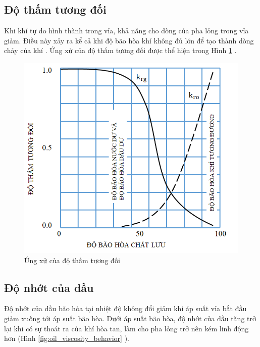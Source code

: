 \documentclass[12pt,a4paper]{report}
\begin{document}
\subsection{Độ thấm tương đối}
Khi khí tự do hình thành trong vỉa, khả năng cho dòng của pha lỏng trong vỉa giảm. Điều này xảy ra kể cả khi độ bão hòa khí không đủ lớn để tạo thành dòng chảy của khí \cite{dale1991production}. Ứng xử của độ thấm tương đối được thể hiện trong Hình \ref{fig:kro_behavior_pi} \cite{dale1991production}.
	\begin{figure}[h]
		\centering
		\includegraphics[scale=0.65]{Fig/kro_behavior_pi.png}
		\caption{Ứng xử của độ thấm tương đối}
		\label{fig:kro_behavior_pi}
	\end{figure}

\subsection{Độ nhớt của dầu}
Độ nhớt của dầu bão hòa tại nhiệt độ không đổi giảm khi áp suất vỉa bắt đầu giảm xuống tới áp suất bão hòa. Dưới áp suất bão hòa, độ nhớt của dầu tăng trở lại khi có sự thoát ra của khí hòa tan, làm cho pha lỏng trở nên kém linh động hơn (Hình \ref{fig:oil_viscosity_behavior} \cite{ahmed2006reservoir}).\\
\end{document}
